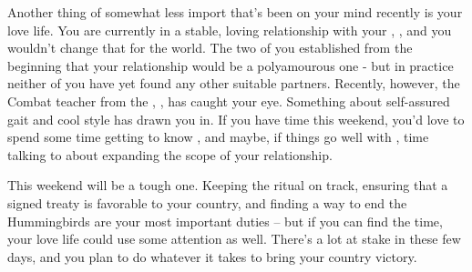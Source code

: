 \documentclass[char]{GL2020}
\begin{document}
Another thing of somewhat less import that’s been on your mind recently is your love life. You are currently in a stable, loving relationship with your \cBeetle{\partner}, \cBeetle{}, and you wouldn’t change that for the world. The two of you established from the beginning that your relationship would be a polyamourous one - but in practice neither of you have yet found any other suitable partners. Recently, however, the Combat teacher from the \pFarm{}, \cInterpol{}, has caught your eye. Something about \cInterpol{\their} self-assured gait and cool style has drawn you in. If you have time this weekend, you’d love to spend some time getting to know \cInterpol{}, and maybe, if things go well with \cInterpol{\them}, time talking to \cBeetle{} about expanding the scope of your relationship.


This weekend will be a tough one. Keeping the ritual on track, ensuring that a signed treaty is favorable to your country, and finding a way to end the Hummingbirds are your most important duties -- but if you can find the time, your love life could use some attention as well. There’s a lot at stake in these few days, and you plan to do whatever it takes to bring your country victory.
\end{document}
